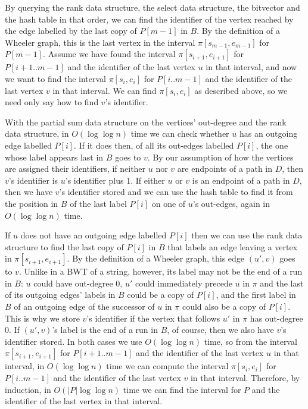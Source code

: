 By querying the rank data structure, the select data structure, the bitvector and the hash table in that order, we can find the identifier of the vertex reached by the edge labelled by the last copy of $P [m - 1]$ in $B$.  By the definition of a Wheeler graph, this is the last vertex in the interval $\pi [s_{m - 1}, e_{m - 1}]$ for $P [m - 1]$.  Assume we have found the interval $\pi [s_{i + 1}, e_{i + 1}]$ for $P [i + 1..m - 1]$ and the identifier of the last vertex $u$ in that interval, and now we want to find the interval $\pi [s_i, e_i]$ for $P [i..m - 1]$ and the identifier of the last vertex $v$ in that interval.  We can find $\pi [s_i, e_i]$ as described above, so we need only say how to find $v$'s identifier.

With the partial sum data structure on the vertices' out-degree and the rank data structure, in $O (\log \log n)$ time we can check whether $u$ has an outgoing edge labelled $P [i]$.  If it does then, of all its out-edges labelled $P [i]$, the one whose label appears last in $B$ goes to $v$.  By our assumption of how the vertices are assigned their identifiers, if neither $u$ nor $v$ are endpoints of a path in $D$, then $v$'s identifier is $u$'s identifier plus 1.  If either $u$ or $v$ is an endpoint of a path in $D$, then we have $v$'s identifier stored and we can use the hash table to find it from the position in $B$ of the last label $P [i]$ on one of $u$'s out-edges, again in $O (\log \log n)$ time.

If $u$ does not have an outgoing edge labelled $P [i]$ then we can use the rank data structure to find the last copy of $P [i]$ in $B$ that labels an edge leaving a vertex in $\pi [s_{i + 1}, e_{i + 1}]$.  By the definition of a Wheeler graph, this edge $(u', v)$ goes to $v$.  Unlike in a BWT of a string, however, its label may not be the end of a run in $B$: $u$ could have out-degree 0, $u'$ could immediately precede $u$ in $\pi$ and the last of its outgoing edges' labels in $B$ could be a copy of $P [i]$, and the first label in $B$ of an outgoing edge of the successor of $u$ in $\pi$ could also be a copy of $P [i]$.  This is why we store $v$'s identifier if the vertex that follows $u'$ in $\pi$ has out-degree 0.  If $(u', v)$'s label is the end of a run in $B$, of course, then we also have $v$'s identifier stored.  In both cases we use $O (\log \log n)$ time, so from the interval $\pi [s_{i + 1}, e_{i + 1}]$ for $P [i + 1..m - 1]$ and the identifier of the last vertex $u$ in that interval, in $O (\log \log n)$ time we can compute the interval $\pi [s_i, e_i]$ for $P [i..m - 1]$ and the identifier of the last vertex $v$ in that interval.  Therefore, by induction, in $O (|P| \log \log n)$ time we can find the interval for $P$ and the identifier of the last vertex in that interval.

